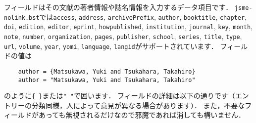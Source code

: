 \documentclass[a4paper,fleqn,uplatex,dvipdfmx]{jsarticle}
\newcommand{\jsmefile}{\texttt{jsme-nolink.bst}}
\begin{document}
フィールドはその文献の著者情報や誌名情報を入力するデータ項目です．
\jsmefile では\verb|access|, \verb|address|, \verb|archivePrefix|, \verb|author|, \verb|booktitle|, \verb|chapter|, \verb|doi|, \verb|edition|, \verb|editor|, \verb|eprint|, \verb|howpublished|, \verb|institution|, \verb|journal|, \verb|key|, \verb|month|, \verb|note|, \verb|number|, \verb|organization|, \verb|pages|, \verb|publisher|, \verb|school|, \verb|series|, \verb|title|, \verb|type|, \verb|url|, \verb|volume|, \verb|year|, \verb|yomi|, \verb|language|, \verb|langid|がサポートされています．
フィールドの値は
\begin{verbatim}
    author = {Matsukawa, Yuki and Tsukahara, Takahiro}
    author = "Matsukawa, Yuki and Tsukahara, Takahiro"
\end{verbatim}
のように\verb|{ }|または\verb|" "|で囲います．
フィールドの詳細は以下の通りです（エントリーの分類同様，人によって意見が異なる場合があります）．
また，不要なフィールドがあっても無視されるだけなので邪魔であれば消しても構いません．
\end{document}
